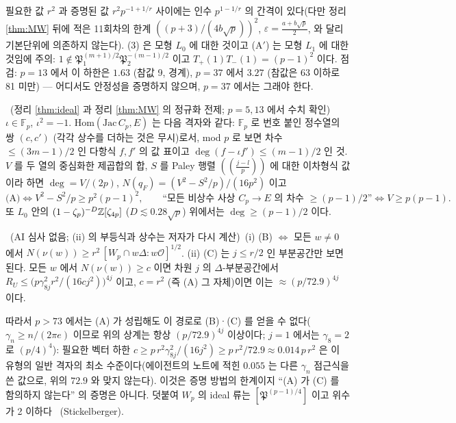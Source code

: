 \noindent 필요한 값 $r^2$ 과 증명된 값 $r^2p^{-1+1/r}$ 사이에는 인수 $p^{1-1/r}$ 의 간격이 있다(다만 정리 \ref{thm:MW} 뒤에 적은 11회차의 한계 $((p+3)/(4b\sqrt p))^2$, $\varepsilon=\tfrac{a+b\sqrt p}2$, 와 달리 기본단위에 의존하지 않는다). (3) 은 모형 $L_0$ 에 대한 것이고 (A$'$) 는 모형 $L_1$ 에 대한 것임에 주의: $1\notin\mathfrak P_1^{(m+1)/2}\mathfrak P_2^{-(m-1)/2}$ 이고 $T_+(1)T_-(1)=(p-1)^2$ 이다. 점검: $p=13$ 에서 이 하한은 $1.63$ (참값 9, 경계), $p=37$ 에서 $3.27$ (참값은 63 이하로 81 미만) --- 어디서도 안정성을 증명하지 않으며, $p=37$ 에서는 그래야 한다.

\begin{proposition}[초등적 형태]\label{prop:poly}\tagP\ (정리 \ref{thm:ideal} 과 정리 \ref{thm:MW} 의 정규화 전제; $p=5,13$ 에서 수치 확인)\
$\iota\in\mathbb F_p$, $\iota^2=-1$. $\mathrm{Hom}(\mathrm{Jac}\,C_p,E)$ 는 다음 격자와 같다: $\mathbb F_p$ 로 번호 붙인 정수열의 쌍 $(c,c')$ (각각 상수를 더하는 것은 무시)로서, mod $p$ 로 보면 차수 $\le(3m-1)/2$ 인 다항식 $f,f'$ 의 값 표이고 $\deg(f-\iota f')\le(m-1)/2$ 인 것. $V$ 를 두 열의 중심화한 제곱합의 합, $S$ 를 Paley 행렬 $((\tfrac{j-l}p))$ 에 대한 이차형식 값이라 하면 $\deg=V/(2p)$, $N(q_F)=(V^2-S^2/p)/(16p^2)$ 이고
\[
\text{(A)}\iff V^2-S^2/p\ge p^2(p-1)^2,\qquad \text{``모든 비상수 사상 $C_p\to E$ 의 차수 $\ge(p-1)/2$''}\iff V\ge p(p-1).
\]
또 $L_0$ 안의 $(1-\zeta_p)^{-D}\mathbb{Z}[\zeta_{4p}]$ ($D\lesssim0.28\sqrt p$) 위에서는 $\deg\ge(p-1)/2$ 이다.
\end{proposition}

\begin{proposition}[(B)·(C) 는 Hermite 형 부등식으로 (A) 에서 나오지 않는다]\label{prop:hermite}\tagP\ (AI 심사 없음; (ii) 의 부등식과 상수는 저자가 다시 계산)\
(i) (B) $\iff$ 모든 $w\ne0$ 에서 $N(\nu(w))\ge r^2\,[W_p\cap w\Delta:w\mathcal O]^{1/2}$. (ii) (C) 는 $j\le r/2$ 인 부분공간만 보면 된다. 모든 $w$ 에서 $N(\nu(w))\ge c$ 이면 차원 $j$ 의 $\Delta$-부분공간에서 $R_U\le\big(p\gamma_{8j}^2r^2/(16cj^2)\big)^{4j}$ 이고, $c=r^2$ (즉 (A) 그 자체)이면 이는 $\approx(p/72.9)^{4j}$ 이다.
\end{proposition}
\noindent 따라서 $p>73$ 에서는 (A) 가 성립해도 이 경로로 (B)·(C) 를 얻을 수 없다($\gamma_n\ge n/(2\pi e)$ 이므로 위의 상계는 항상 $(p/72.9)^{4j}$ 이상이다; $j=1$ 에서는 $\gamma_8=2$ 로 $(p/4)^4$): 필요한 벡터 하한 $c\ge p\,r^2\gamma_{8j}^2/(16j^2)\ge p\,r^2/72.9\approx0.014\,p\,r^2$ 은 이 유형의 일반 격자의 최소 수준이다(에이전트의 노트에 적힌 $0.055$ 는 다른 $\gamma_n$ 점근식을 쓴 값으로, 위의 $72.9$ 와 맞지 않는다). 이것은 증명 방법의 한계이지 ``(A) 가 (C) 를 함의하지 않는다'' 의 증명은 아니다. 덧붙여 $W_p$ 의 ideal 류는 $[\mathfrak P^{(p-1)/4}]$ 이고 위수가 2 이하다 \tagPL\ (Stickelberger).

